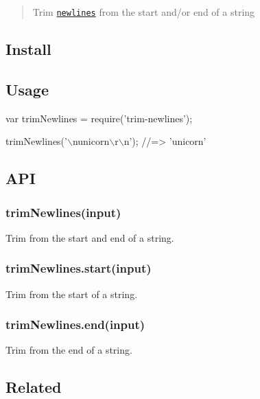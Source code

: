 \begin{quote}
Trim \href{https://en.wikipedia.org/wiki/Newline}{\tt newlines} from the start and/or end of a string \end{quote}


\subsection*{Install}




\subsection*{Usage}


\begin{DoxyCode}
var trimNewlines = require('trim-newlines');

trimNewlines('\(\backslash\)nunicorn\(\backslash\)r\(\backslash\)n');
//=> 'unicorn'
\end{DoxyCode}


\subsection*{A\+PI}

\subsubsection*{trim\+Newlines(input)}

Trim from the start and end of a string.

\subsubsection*{trim\+Newlines.\+start(input)}

Trim from the start of a string.

\subsubsection*{trim\+Newlines.\+end(input)}

Trim from the end of a string.

\subsection*{Related}


